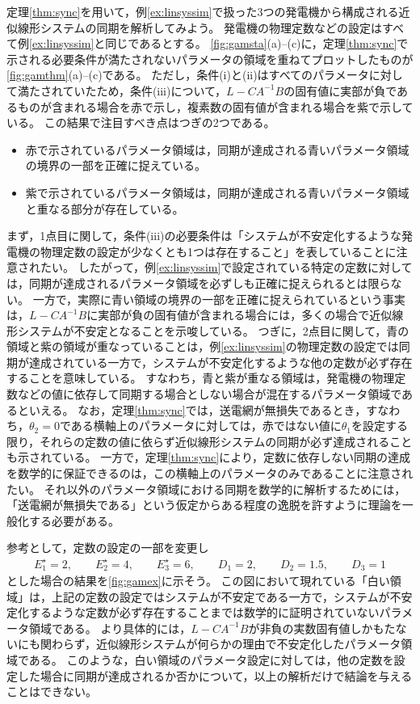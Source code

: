\documentclass[tombow,dvipdfmx]{corona-a5}
\begin{document}
\begin{例}[正実性や特異摂動近似に基づく近似線形システムの同期解析]\label{ex:linthm}
定理\ref{thm:sync}を用いて，例\ref{ex:linsyssim}で扱った3つの発電機から構成される近似線形システムの同期を解析してみよう。
発電機の物理定数などの設定はすべて例\ref{ex:linsyssim}と同じであるとする。
\ref{fig:gamsta}(a)--(c)に，定理\ref{thm:sync}で示される必要条件が満たされないパラメータの領域を重ねてプロットしたものが\ref{fig:gamthm}(a)--(c)である。
ただし，条件(i)と(ii)はすべてのパラメータに対して満たされていたため，条件(iii)について，$L-CA^{-1}B$の固有値に実部が負であるものが含まれる場合を赤で示し，複素数の固有値が含まれる場合を紫で示している。
この結果で注目すべき点はつぎの2つである。
\begin{itemize}
\item 赤で示されているパラメータ領域は，同期が達成される青いパラメータ領域の境界の一部を正確に捉えている。
\item 紫で示されているパラメータ領域は，同期が達成される青いパラメータ領域と重なる部分が存在している。
\end{itemize}
まず，1点目に関して，条件(iii)の必要条件は「システムが不安定化するような発電機の物理定数の設定が少なくとも1つは存在すること」を表していることに注意されたい。
したがって，例\ref{ex:linsyssim}で設定されている特定の定数に対しては，同期が達成されるパラメータ領域を必ずしも正確に捉えられるとは限らない。
一方で，実際に青い領域の境界の一部を正確に捉えられているという事実は，$L-CA^{-1}B$に実部が負の固有値が含まれる場合には，多くの場合で近似線形システムが不安定となることを示唆している。
つぎに，2点目に関して，青の領域と紫の領域が重なっていることは，例\ref{ex:linsyssim}の物理定数の設定では同期が達成されている一方で，システムが不安定化するような他の定数が必ず存在することを意味している。
すなわち，青と紫が重なる領域は，発電機の物理定数などの値に依存して同期する場合としない場合が混在するパラメータ領域であるといえる。
なお，定理\ref{thm:sync}では，送電網が無損失であるとき，すなわち，$\theta_2=0$である横軸上のパラメータに対しては，赤ではない値に$\theta_1$を設定する限り，それらの定数の値に依らず近似線形システムの同期が必ず達成されることも示されている。
一方で，定理\ref{thm:sync}により，定数に依存しない同期の達成を数学的に保証できるのは，この横軸上のパラメータのみであることに注意されたい。
それ以外のパラメータ領域における同期を数学的に解析するためには，「送電網が無損失である」という仮定からある程度の逸脱を許すように理論を一般化する必要がある。

参考として，定数の設定の一部を変更し
\begin{align*}
E_1^{\star}=2
,\qquad
E_2^{\star}=4
,\qquad
E_3^{\star}=6
,\qquad
D_1 = 2
,\qquad
D_2 = 1.5
,\qquad
D_3 = 1
\end{align*}
とした場合の結果を\ref{fig:gamex}に示そう。
この図において現れている「白い領域」は，上記の定数の設定ではシステムが不安定である一方で，システムが不安定化するような定数が必ず存在することまでは数学的に証明されていないパラメータ領域である。
より具体的には，$L-CA^{-1}B$が非負の実数固有値しかもたないにも関わらず，近似線形システムが何らかの理由で不安定化したパラメータ領域である。
このような，白い領域のパラメータ設定に対しては，他の定数を設定した場合に同期が達成されるか否かについて，以上の解析だけで結論を与えることはできない。
\end{例}
\end{document}
